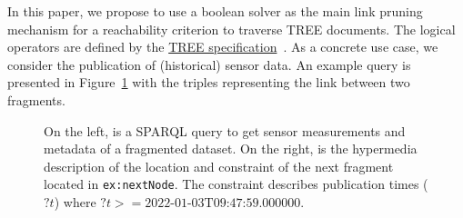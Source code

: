 In this paper, we propose to use a boolean solver as the main link pruning mechanism for a reachability criterion to traverse TREE documents.
The logical operators are defined by the \href{https://treecg.github.io/specification/}{TREE specification}~.
As a concrete use case, we consider the publication of (historical) sensor data.
An example query is presented in Figure~\ref{lst:system} with the triples representing the link between two fragments.

\begin{figure}[h]
    \begin{minipage}{0.50\textwidth}
        \centering
        
    \end{minipage}
    \hspace{0.05\textwidth}
    \begin{minipage}{0.43\textwidth}
        \centering
        
    \end{minipage}
    \caption{On the left, is a SPARQL query to get sensor measurements and metadata of a fragmented dataset.
    On the right, is the hypermedia description of the location and constraint of the next fragment located in \texttt{ex:nextNode}.
    The constraint describes publication times ($?t$) where $?t>= \text{2022-01-03T09:47:59.000000}$.}
        \label{lst:system}
    \vspace*{-0.90cm}
\end{figure}